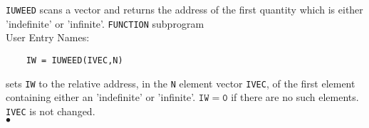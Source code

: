                         
                  
                   
       
{\tt IUWEED} scans a vector and returns the address of the first
quantity which is either 'indefinite' or 'infinite'.
\Structure
{\tt FUNCTION} subprogram \\
User Entry Names: 
\Usage
\begin{verbatim}
    IW = IUWEED(IVEC,N)
\end{verbatim}
sets {\tt IW} to the relative address, in the {\tt N} element vector
{\tt IVEC}, of the first element containing either an 'indefinite' or
'infinite'. $\mathtt{IW = 0}$ if there are no such elements.
{\tt IVEC} is not changed.
\\ $\bullet$
